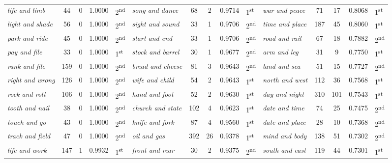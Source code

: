 \begin{table}
{\begin{tabular}[t]{l *{2}{S[table-format=3]} S[table-format=1.4] l  l *{2}{S[table-format=3]} S[table-format=1.4] l  l *{2}{S[table-format=3]} S[table-format=1.4] l}
\textit{life and limb} & 44 & 0 & 1.0000 & 2\textsuperscript{nd} & \textit{song and dance} & 68 & 2 & 0.9714 & 1\textsuperscript{st} & \textit{war and peace} & 71 & 17 & 0.8068 & 1\textsuperscript{st} \\
\textit{light and shade} & 56 & 0 & 1.0000 & 2\textsuperscript{nd} & \textit{sight and sound} & 33 & 1 & 0.9706 & 2\textsuperscript{nd} & \textit{time and place} & 187 & 45 & 0.8060 & 1\textsuperscript{st} \\
\textit{park and ride} & 45 & 0 & 1.0000 & 2\textsuperscript{nd} & \textit{start and end} & 33 & 1 & 0.9706 & 2\textsuperscript{nd} & \textit{road and rail} & 67 & 18 & 0.7882 & 2\textsuperscript{nd} \\
\textit{pay and file} & 33 & 0 & 1.0000 & 1\textsuperscript{st} & \textit{stock and barrel} & 30 & 1 & 0.9677 & 2\textsuperscript{nd} & \textit{arm and leg} & 31 & 9 & 0.7750 & 1\textsuperscript{st} \\
\textit{rank and file} & 159 & 0 & 1.0000 & 2\textsuperscript{nd} & \textit{bread and cheese} & 81 & 3 & 0.9643 & 2\textsuperscript{nd} & \textit{land and sea} & 51 & 15 & 0.7727 & 2\textsuperscript{nd} \\
\textit{right and wrong} & 126 & 0 & 1.0000 & 2\textsuperscript{nd} & \textit{wife and child} & 54 & 2 & 0.9643 & 1\textsuperscript{st} & \textit{north and west} & 112 & 36 & 0.7568 & 1\textsuperscript{st} \\
\textit{rock and roll} & 106 & 0 & 1.0000 & 2\textsuperscript{nd} & \textit{hand and foot} & 52 & 2 & 0.9630 & 1\textsuperscript{st} & \textit{day and night} & 310 & 101 & 0.7543 & 1\textsuperscript{st} \\
\textit{tooth and nail} & 38 & 0 & 1.0000 & 2\textsuperscript{nd} & \textit{church and state} & 102 & 4 & 0.9623 & 1\textsuperscript{st} & \textit{date and time} & 74 & 25 & 0.7475 & 2\textsuperscript{nd} \\
\textit{touch and go} & 43 & 0 & 1.0000 & 2\textsuperscript{nd} & \textit{knife and fork} & 87 & 4 & 0.9560 & 1\textsuperscript{st} & \textit{date and place} & 28 & 10 & 0.7368 & 2\textsuperscript{nd} \\
\textit{track and field} & 47 & 0 & 1.0000 & 2\textsuperscript{nd} & \textit{oil and gas} & 392 & 26 & 0.9378 & 1\textsuperscript{st} & \textit{mind and body} & 138 & 51 & 0.7302 & 2\textsuperscript{nd} \\
\textit{life and work} & 147 & 1 & 0.9932 & 1\textsuperscript{st} & \textit{front and rear} & 30 & 2 & 0.9375 & 2\textsuperscript{nd} & \textit{south and east} & 119 & 44 & 0.7301 & 1\textsuperscript{st} \\

\end{tabular}}
\end{table}
